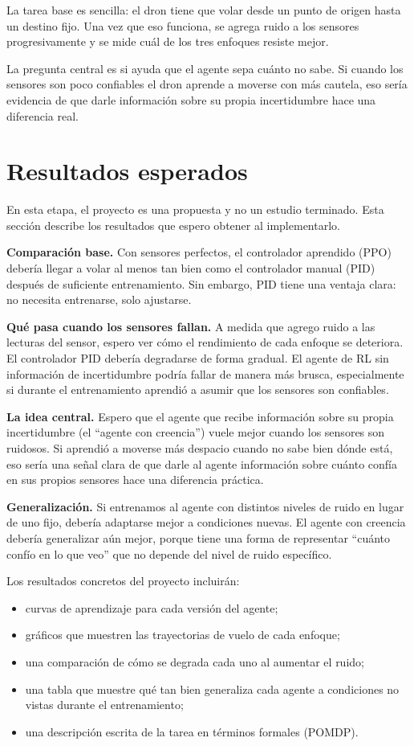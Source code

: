 \documentclass[11pt]{article}
\begin{document}
La tarea base es sencilla: el dron tiene que volar desde un punto de origen hasta un destino fijo.
Una vez que eso funciona, se agrega ruido a los sensores progresivamente y se mide cuál de los tres enfoques resiste mejor.

La pregunta central es si ayuda que el agente sepa cuánto no sabe. Si cuando los sensores
son poco confiables el dron aprende a moverse con más cautela, eso sería evidencia
de que darle información sobre su propia incertidumbre hace una diferencia real.


\section*{Resultados esperados}

En esta etapa, el proyecto es una propuesta y no un estudio terminado. Esta sección describe los resultados que espero obtener al implementarlo.

\textbf{Comparación base.} Con sensores perfectos, el controlador aprendido (PPO) debería llegar a volar
al menos tan bien como el controlador manual (PID) después de suficiente entrenamiento.
Sin embargo, PID tiene una ventaja clara: no necesita entrenarse, solo ajustarse.

\textbf{Qué pasa cuando los sensores fallan.} A medida que agrego ruido a las
lecturas del sensor, espero ver cómo el rendimiento de cada enfoque se deteriora.
El controlador PID debería degradarse de forma gradual. El agente de RL sin información de
incertidumbre podría fallar de manera más brusca, especialmente si durante el entrenamiento aprendió a
asumir que los sensores son confiables.

\textbf{La idea central.} Espero que el agente que recibe información sobre su propia incertidumbre
(el ``agente con creencia'') vuele mejor cuando los sensores son ruidosos.
Si aprendió a moverse más despacio cuando no sabe bien dónde está, eso sería una señal clara de que darle
al agente información sobre cuánto confía en sus propios sensores hace una diferencia práctica.

\textbf{Generalización.} Si entrenamos al agente con distintos niveles de ruido en lugar de uno fijo,
debería adaptarse mejor a condiciones nuevas.
El agente con creencia debería generalizar aún mejor, porque tiene una forma de representar ``cuánto confío en lo que veo'' que no depende del nivel de ruido específico.

Los resultados concretos del proyecto incluirán:
\begin{itemize}[leftmargin=1.8em]
    \item curvas de aprendizaje para cada versión del agente;
    \item gráficos que muestren las trayectorias de vuelo de cada enfoque;
    \item una comparación de cómo se degrada cada uno al aumentar el ruido;
    \item una tabla que muestre qué tan bien generaliza cada agente a condiciones no vistas durante el entrenamiento;
    \item una descripción escrita de la tarea en términos formales (POMDP).
\end{itemize}
\end{document}
